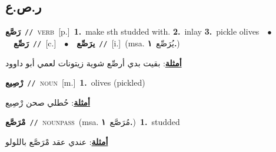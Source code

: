 \documentclass[10pt,a4paper,twoside]{article} %
\begin{document}
\begin{multicols}{2}
\vspace{-3mm}
\subsection*{\color{blue}\foreignlanguage{arabic}{ر.ص.ع}\color{blue}{}} 

{\setlength\topsep{0pt}\textbf{\foreignlanguage{arabic}{رَصَّع}}\ {\color{gray}\texttt{//}\color{black}}\ \textsc{verb}\ [p.]\ \textbf{1.}~make sth studded with.  \textbf{2.}~inlay  \textbf{3.}~pickle olives\ \ $\bullet$\ \ \setlength\topsep{0pt}\textbf{\foreignlanguage{arabic}{رَصِّع}}\ {\color{gray}\texttt{//}\color{black}}\ [c.]\ \ $\bullet$\ \ \setlength\topsep{0pt}\textbf{\foreignlanguage{arabic}{يرَصِّع}}\ {\color{gray}\texttt{//}\color{black}}\ [i.]\ \color{gray}(msa. \foreignlanguage{arabic}{يُرَصِّع}~\foreignlanguage{arabic}{\textbf{١.}})\color{black}\  \begin{flushright}\color{gray}\foreignlanguage{arabic}{\textbf{\underline{\foreignlanguage{arabic}{أمثلة}}}: بقيت بدي أرصِّع شوية زيتونات لعمي أبو داوود}\end{flushright}\color{black}} \vspace{2mm}

{\setlength\topsep{0pt}\textbf{\foreignlanguage{arabic}{رْصِيع}}\ {\color{gray}\texttt{//}\color{black}}\ \textsc{noun}\ [m.]\ \textbf{1.}~olives (pickled)\  \begin{flushright}\color{gray}\foreignlanguage{arabic}{\textbf{\underline{\foreignlanguage{arabic}{أمثلة}}}: حُطلي صحن رْصِيع}\end{flushright}\color{black}} \vspace{2mm}

{\setlength\topsep{0pt}\textbf{\foreignlanguage{arabic}{مْرَصَّع}}\ {\color{gray}\texttt{//}\color{black}}\ \textsc{noun\textunderscore pass}\ \color{gray}(msa. \foreignlanguage{arabic}{مُرَصَّع}~\foreignlanguage{arabic}{\textbf{١.}})\color{black}\ \textbf{1.}~studded\  \begin{flushright}\color{gray}\foreignlanguage{arabic}{\textbf{\underline{\foreignlanguage{arabic}{أمثلة}}}: عندي عقد مْرَصَّع باللولو}\end{flushright}\color{black}} \vspace{2mm}


\end{multicols}
\end{document}
